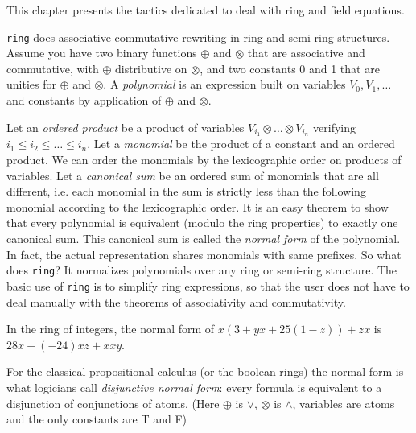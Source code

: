 \label{ring}

This chapter presents the tactics dedicated to deal with ring and
field equations.


\texttt{ring} does associative-commutative rewriting in ring and semi-ring
structures. Assume you have two binary functions $\oplus$ and $\otimes$
that are associative and commutative, with $\oplus$ distributive on
$\otimes$, and two constants 0 and 1 that are unities for $\oplus$ and
$\otimes$. A \textit{polynomial} is an expression built on variables $V_0, V_1,
\dots$ and constants by application of $\oplus$ and $\otimes$.

Let an {\it ordered product} be a product of variables $V_{i_1}
\otimes \ldots \otimes V_{i_n}$ verifying $i_1 \le i_2 \le \dots \le
i_n$. Let a \textit{monomial} be the product of a constant and an
ordered product.  We can order the monomials by the lexicographic
order on products of variables. Let a \textit{canonical sum} be an
ordered sum of monomials that are all different, i.e. each monomial in
the sum is strictly less than the following monomial according to the
lexicographic order. It is an easy theorem to show that every
polynomial is equivalent (modulo the ring properties) to exactly one
canonical sum. This canonical sum is called the \textit{normal form}
of the polynomial. In fact, the actual representation shares monomials
with same prefixes. So what does \texttt{ring}? It normalizes
polynomials over any ring or semi-ring structure. The basic use of
\texttt{ring} is to simplify ring expressions, so that the user does
not have to deal manually with the theorems of associativity and
commutativity.

\begin{Examples}
\item In the ring of integers, the normal form of 
$x (3 + yx + 25(1 - z)) + zx$ is $28x + (-24)xz + xxy$.
\item For the classical propositional calculus (or the boolean rings)
  the normal form is what logicians call \textit{disjunctive normal
    form}: every formula is equivalent to a disjunction of
  conjunctions of atoms. (Here $\oplus$ is $\vee$, $\otimes$ is
  $\wedge$, variables are atoms and the only constants are T and F)
\end{Examples}

